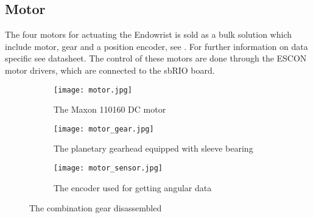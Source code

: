 \subsection{Motor}\label{Maxon_Motor}
The four motors for actuating the Endowrist is sold as a bulk solution which include motor, gear and a position encoder, see . For further information on data specific see datasheet.
The control of these motors are done through the ESCON motor drivers, which are connected to the sbRIO board.


\begin{figure}[H]
	\centering
	\begin{subfigure}{.32\textwidth}
		\vspace{0pt}
		\centering
		\texttt{[image: motor.jpg]}
		\caption{The Maxon 110160 \newline DC motor}
		\label{fig:motor}
	\end{subfigure}
	\begin{subfigure}{.32\textwidth}
		\centering
		\texttt{[image: motor\_gear.jpg]}
		\caption{The planetary gearhead equipped with sleeve bearing}
		\label{fig:motor_gear}
	\end{subfigure}
	\begin{subfigure}{.32\textwidth}
		\centering
		\texttt{[image: motor\_sensor.jpg]}
		\caption{The encoder used for getting angular data}
		\label{fig:motor_sensor}
	\end{subfigure}
	\caption{The combination gear disassembled}
	\label{fig:Full_motor _dis}
\end{figure}

